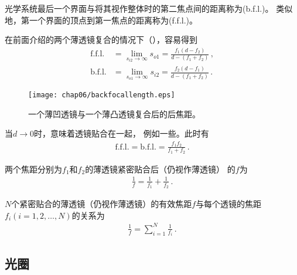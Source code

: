 \begin{definition}
    光学系统最后一个界面与将其视作整体时的第二焦点间的距离称为(b.f.l.)。
    类似地，第一个界面的顶点到第一焦点的距离称为(f.f.l.)。
\end{definition}

在前面介绍的两个薄透镜复合的情况下（），容易得到
\begin{align}
    \text{f.f.l.} & =\lim\limits_{s_{i2}\rightarrow \infty}{s_{o1}}=\frac{f_1(d-f_2)}{d-(f_1+f_2)}\, , \\
    \text{b.f.l.} & =\lim\limits_{s_{o1}\rightarrow \infty}{s_{i2}}=\frac{f_2(d-f_1)}{d-(f_1+f_2)}\, .
\end{align}
\begin{figure}[htbp]
    \centering\texttt{[image: chap06/backfocallength.eps]}
    \caption{一个薄凹透镜与一个薄凸透镜复合后的后焦距。}
    \label{fig:6.47}
\end{figure}

当$d\rightarrow 0$时，意味着透镜贴合在一起，
例如一些。此时有
\begin{align}
    \text{f.f.l.}=\text{b.f.l.}=\frac{f_1f_2}{f_1+f_2}\, .
\end{align}

\begin{proposition}
    两个焦距分别为$f_1$和$f_2$的薄透镜紧密贴合后（仍视作薄透镜）
    的$f$为
    \begin{align}
        \frac{1}{f}=\frac{1}{f_1}+\frac{1}{f_2}\, .
    \end{align}
\end{proposition}
\begin{corollary}
    $N$个紧密贴合的薄透镜（仍视作薄透镜）的有效焦距$f$与每个透镜的焦距$f_i (i=1,2,\ldots,N)$的关系为
    \begin{align}
        \frac{1}{f}=\sum\limits_{i=1}^{N}{\frac{1}{f_i}}\, .
    \end{align}
\end{corollary}

\subsection{光圈}\label{sub:光圈}
